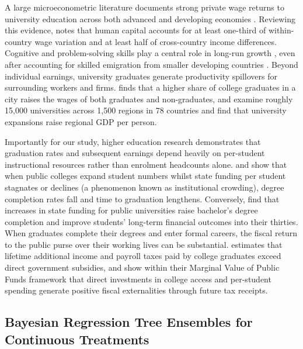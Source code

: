 \documentclass[11pt,a4paper]{article}
\begin{document}
A large microeconometric literature documents strong private wage returns to university education across both advanced and developing economies \citep{carneiro2011estimating, zimmerman2014returns, psacharopoulos2018returns, chetty2020income, mountjoy2022community}. Reviewing this evidence, \citet{deming2022four} notes that human capital accounts for at least one-third of within-country wage variation and at least half of cross-country income differences. Cognitive and problem-solving skills play a central role in long-run growth \citep{hanushek2012better, angrist2021measuring}, even after accounting for skilled emigration from smaller developing countries \citep{beine2008brain}. Beyond individual earnings, university graduates generate productivity spillovers for surrounding workers and firms. \citet{moretti2004estimating} finds that a higher share of college graduates in a city raises the wages of both graduates and non-graduates, and \citet{valero2019economic} examine roughly 15,000 universities across 1,500 regions in 78 countries and find that university expansions raise regional GDP per person.

Importantly for our study, higher education research demonstrates that graduation rates and subsequent earnings depend heavily on per-student instructional resources rather than enrolment headcounts alone. \citet{bound2010have} and \citet{deming2017impact} show that when public colleges expand student numbers whilst state funding per student stagnates or declines (a phenomenon known as institutional crowding), degree completion rates fall and time to graduation lengthens. Conversely, \citet{chakrabarti2020state} find that increases in state funding for public universities raise bachelor's degree completion and improve students' long-term financial outcomes into their thirties. When graduates complete their degrees and enter formal careers, the fiscal return to the public purse over their working lives can be substantial. \citet{trostel2010fiscal} estimates that lifetime additional income and payroll taxes paid by college graduates exceed direct government subsidies, and \citet{hendren2020unified} show within their Marginal Value of Public Funds framework that direct investments in college access and per-student spending generate positive fiscal externalities through future tax receipts.

\subsection{Bayesian Regression Tree Ensembles for Continuous Treatments}
\end{document}
